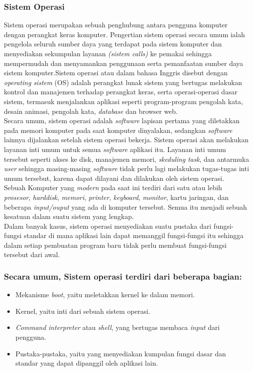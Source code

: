 \documentclass[12pt]{article}
\begin{document}
\subsubsection{Sistem Operasi}
Sistem operasi merupakan sebuah penghubung antara pengguna komputer dengan perangkat keras komputer. Pengertian sistem operasi secara umum ialah pengelola seluruh sumber daya yang terdapat pada sistem komputer dan menyediakan sekumpulan layanan \textit{(sistem calls)} ke pemakai sehingga mempermudah dan menyamankan penggunaan serta pemanfaatan sumber daya sistem komputer.Sistem operasi atau dalam bahasa Inggris disebut dengan \textit{operating sistem} (OS) adalah perangkat lunak sistem yang bertugas melakukan kontrol dan manajemen terhadap perangkat keras, serta operasi-operasi dasar sistem, termasuk menjalankan aplikasi seperti program-program pengolah kata, desain animasi, pengolah kata, \textit{database} dan browser web. 
\\[12pt]
Secara umum, sistem operasi adalah \textit{software} lapisan pertama yang diletakkan pada memori komputer pada saat komputer dinyalakan, sedangkan \textit{software} lainnya dijalankan setelah sistem operasi bekerja. Sistem operasi akan melakukan layanan inti umum untuk semua \textit{software} aplikasi itu. Layanan inti umum tersebut seperti akses ke disk, manajemen memori, \textit{skeduling task}, dan antarmuka \textit{user} sehingga masing-masing \textit{software} tidak perlu lagi melakukan tugas-tugas inti umum tersebut, karena dapat dilayani dan dilakukan oleh sistem operasi. 
\\[12pt]
Sebuah Komputer yang \textit{modern} pada saat ini terdiri dari satu atau lebih \textit{prosesor}, \textit{harddisk}, \textit{memori}, \textit{printer}, \textit{keyboard}, \textit{monitor}, kartu jaringan, dan beberapa \textit{input/ouput} yang ada di komputer tersebut. Semua itu menjadi sebuah kesatuan dalam suatu sistem yang lengkap.
\\[12pt]
Dalam banyak kasus, sistem operasi menyediakan suatu pustaka dari fungsi-fungsi standar di mana aplikasi lain dapat memanggil fungsi-fungsi itu sehingga dalam setiap pembuatan program baru tidak perlu membuat fungsi-fungsi tersebut dari awal.
\subsubsection *{Secara umum, Sistem operasi terdiri dari beberapa bagian:}
\begin{itemize}
    \item Mekanisme \textit{boot}, yaitu meletakkan kernel ke dalam memori.
    \item Kernel, yaitu inti dari sebuah sistem operasi.
    \item \textit{Command interpreter} atau \textit{shell}, yang bertugas membaca \textit{input} dari pengguna.
    \item Pustaka-pustaka, yaitu yang menyediakan kumpulan fungsi dasar dan standar yang dapat dipanggil oleh aplikasi lain.
\end{itemize}
\end{document}
